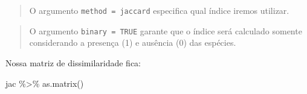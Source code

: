 \documentclass[
]{book}
\newenvironment{Shaded}{\begin{snugshade}}{\end{snugshade}}
\newcommand{\FunctionTok}[1]{\textcolor[rgb]{0.00,0.00,0.00}{#1}}
\newcommand{\NormalTok}[1]{#1}
\newcommand{\SpecialCharTok}[1]{\textcolor[rgb]{0.00,0.00,0.00}{#1}}
\begin{document}
\begin{quote}
O argumento \texttt{method\ =\ \textquotesingle{}jaccard\textquotesingle{}} especifica qual índice iremos utilizar.
\end{quote}

\begin{quote}
O argumento \texttt{binary\ =\ TRUE} garante que o índice será calculado somente considerando a presença (1) e ausência (0) das espécies.
\end{quote}

Nossa matriz de dissimilaridade fica:

\begin{Shaded}
\begin{Highlighting}[]
\NormalTok{jac }\SpecialCharTok{\%\textgreater{}\%} \FunctionTok{as.matrix}\NormalTok{()}
\end{Highlighting}
\end{Shaded}
\end{document}
